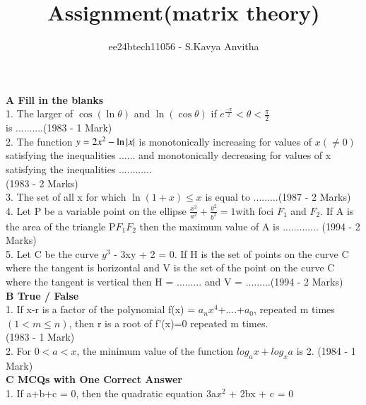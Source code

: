 \documentclass[journal,12pt,twocolumn]{IEEEtran}
\theoremstyle{remark}
\begin{document}

\vspace{3cm}

\title{Assignment(matrix theory)}
\author{ee24btech11056 - S.Kavya Anvitha}
\maketitle
\textbf{A Fill in the blanks}\\
1.  The larger of $\cos (\ln \theta)$ and  $\ln (\cos \theta)$ if
$e^{\frac{-\pi}{2}}< \theta< \frac{\pi}{2}$\\
\indent is ..........\hfill(1983 - 1 Mark)\\
 2.  The function $y=2x^{2}-\ln \left\vert x\right\vert$ is monotonically \indent increasing
 for values of $x(\neq0)$ satisfying the \indent inequalities ...... and
 monotonically decreasing for \indent values of x satisfying the inequalities 
 ............\\ \indent\hfill(1983 - 2 Marks)\\
3.  The set of all x for which $\ln (1+x) \leq x$ is equal \indent
to .........\hfill(1987 - 2 Marks)\\
4.  Let P be a variable point on the ellipse
$\frac{x^2}{a^2}+\frac{y^2}{b^2} = 1$\indent with foci 
$F_1$ and $F_2$. If A is the area of the \indent triangle 
P$F_1$$F_2$ then the maximum value of A is \hspace{5cm}\indent............. 
\hfill(1994 - 2 Marks)\\
5.  Let C be the curve $y^3$ - 3xy + 2 = 0. If H is the \indent set of
points on the curve C where the tangent \indent is horizontal and V is
the set of the point on the \indent curve C where the tangent is vertical
then H = \indent ......... and V = .........\hfill(1994 - 2 Marks)\\
\indent\hspace{0.3cm}\textbf{B True / False}\\
1. If x-r is a factor of the polynomial f(x) = \indent $a_n$$x^4$+....+$a_0$,
repeated m times $(1< m\leq n)$, then \indent r is a root of f'(x)=0 
repeated m times.\\
\indent \hfill(1983 - 1 Mark)\\
2.  For $0 < a < x$, the minimum value of the function \indent 
$log_a x + log_x a$ is 2. \hfill(1984 - 1 Mark)\\
\indent\hspace{0.3cm}\textbf{C MCQs with One Correct Answer}\\[6pt]
1.  If a+b+c = 0, then the quadratic equation 3a$x^2$ \indent + 2bx + c = 0 
\end{document}
